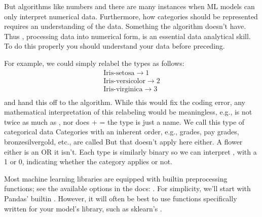 \documentclass[letterpaper,10pt,english]{jupyterBook}
\begin{document}
\sphinxAtStartPar
But algorithms like numbers and there are many instances when ML models can only interpret numerical data. Furthermore, how categories should be represented requires an understanding of the data. Something the algorithm doesn’t have. Thus , processing data into numerical form, is an essential data analytical skill. To do this properly you should understand your data before preceding.

\sphinxAtStartPar
For example, we could simply re\sphinxhyphen{}label the types as follows:
\begin{equation*}
\begin{split} 
  \text{Iris-setosa} \rightarrow 1 \\
  \text{Iris-versicolor} \rightarrow 2 \\
  \text{Iris-virginica} \rightarrow 3 \\
\end{split}
\end{equation*}
\sphinxAtStartPar
and hand this off to the algorithm. While this would fix the coding error, any mathematical interpretation of this re\sphinxhyphen{}labeling would be meaningless, e.g.,  is not twice as much as , nor does  +  =  \sphinxhyphen{}the type is just a name. We call this type of categorical data  Categories with an inherent order, e.g., grades, pay grades, bronze\sphinxhyphen{}silver\sphinxhyphen{}gold, etc., are called  But that doesn’t apply here either. A flower either is an  OR it isn’t. Each type is similarly binary so we can interpret , with a 1 or 0, indicating whether the category applies or not.

\sphinxAtStartPar
Most machine learning libraries are equipped with built\sphinxhyphen{}in preprocessing functions; see the available options in the docs: . For simplicity, we’ll start with Pandas’ built\sphinxhyphen{}in . However, it will often be best to use functions specifically written for your model’s library, such as sklearn’s .
\end{document}
